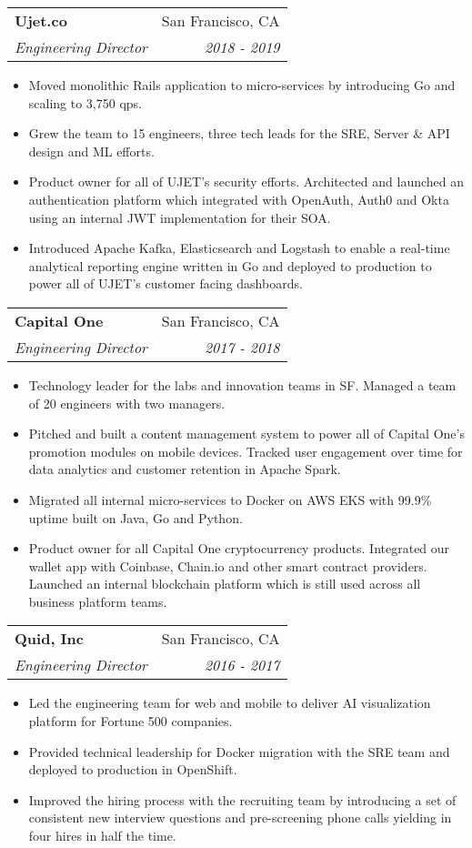 \documentclass[letterpaper,11pt]{article}
\makeatletter
\newcommand{\resumeSubheading}[4]{
  \vspace{-1pt}\item
    \begin{tabular*}{0.97\textwidth}[t]{l@{\extracolsep{\fill}}r}
      \textbf{#1} & #2 \\
      \textit{\small#3} & \textit{\small #4} \\
    \end{tabular*}\vspace{-5pt}
}
\newcommand{\resumeItemListStart}{\begin{itemize}}
\newcommand{\resumeItemListEnd}{\end{itemize}\vspace{-5pt}}
\makeatother
\begin{document}
      \resumeSubheading
        {Ujet.co}{San Francisco, CA}
        {Engineering Director}{2018 - 2019}
      \resumeItemListStart
        \item Moved monolithic Rails application to micro-services by introducing Go and scaling to 3,750 qps.
        \item Grew the team to 15 engineers, three tech leads for the SRE, Server \& API design and ML efforts.
        \item Product owner for all of UJET’s security efforts. Architected and launched an authentication platform which integrated with OpenAuth, Auth0 and Okta using an internal JWT implementation for their SOA.
        \item Introduced Apache Kafka, Elasticsearch and Logstash to enable a real-time analytical reporting engine written in Go and deployed to production to power all of UJET’s customer facing dashboards.
      \resumeItemListEnd

    \pagebreak[3]

    \resumeSubheading
    {Capital One}{San Francisco, CA}
    {Engineering Director}{2017 - 2018}
    \resumeItemListStart
      \item Technology leader for the labs and innovation teams in SF. Managed a team of 20 engineers with two managers.
      \item Pitched and built a content management system to power all of Capital One’s promotion modules on mobile devices. Tracked user engagement over time for data analytics and customer retention in Apache Spark.
      \item Migrated all internal micro-services to Docker on AWS EKS with 99.9\% uptime built on Java, Go and Python.
      \item Product owner for all Capital One cryptocurrency products. Integrated our wallet app with Coinbase, Chain.io and other smart contract providers. Launched an internal blockchain platform which is still used across all business platform teams.
    \resumeItemListEnd

    \pagebreak[3]

    \resumeSubheading
    {Quid, Inc}{San Francisco, CA}
    {Engineering Director}{2016 - 2017}
    \resumeItemListStart
      \item Led the engineering team for web and mobile to deliver AI visualization platform for Fortune 500 companies.
      \item Provided technical leadership for Docker migration with the SRE team and deployed to production in OpenShift.
      \item Improved the hiring process with the recruiting team by introducing a set of consistent new interview questions and pre-screening phone calls yielding in four hires in half the time.
    \resumeItemListEnd
\end{document}
